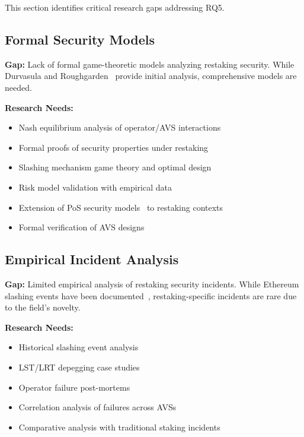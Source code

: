 \documentclass[runningheads]{llncs}
\begin{document}
This section identifies critical research gaps addressing RQ5.

\subsection{Formal Security Models}

\textbf{Gap:} Lack of formal game-theoretic models analyzing restaking security. While Durvasula and Roughgarden~\cite{durvasula2024robust} provide initial analysis, comprehensive models are needed.

\textbf{Research Needs:}
\begin{itemize}
    \item Nash equilibrium analysis of operator/AVS interactions~\cite{durvasula2024robust}
    \item Formal proofs of security properties under restaking~\cite{ahmed2021survey,perez2021security}
    \item Slashing mechanism game theory and optimal design
    \item Risk model validation with empirical data
    \item Extension of PoS security models~\cite{kiayias2017ouroboros,buterin2017casper,buchman2016tendermint,kwon2014tendermint} to restaking contexts
    \item Formal verification of AVS designs~\cite{zhang2024proof}
\end{itemize}

\subsection{Empirical Incident Analysis}

\textbf{Gap:} Limited empirical analysis of restaking security incidents. While Ethereum slashing events have been documented~\cite{ethereum2024staking}, restaking-specific incidents are rare due to the field's novelty.

\textbf{Research Needs:}
\begin{itemize}
    \item Historical slashing event analysis~\cite{ethereum2024staking}
    \item LST/LRT depegging case studies~\cite{trailofbits2023staking}
    \item Operator failure post-mortems
    \item Correlation analysis of failures across AVSs
    \item Comparative analysis with traditional staking incidents
\end{itemize}
\end{document}
